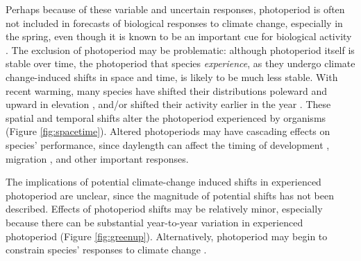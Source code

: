 \documentclass{article}
\begin{document}
\par Perhaps because of these variable and uncertain responses, photoperiod is often not included in forecasts of biological responses to climate change, especially in the spring, even though it is known to be an important cue for biological activity \citep[but see ][]{duputie2015,Caffarra:2011qf,grevstad2015}. The exclusion of photoperiod may be problematic: although photoperiod itself is stable over time, the photoperiod that species \emph{experience}, as they undergo climate change-induced shifts in space and time, is likely to be much less stable. With recent warming, many species have shifted their distributions poleward and upward in elevation \citep[i.e., range shifts,][]{parmesan2006,chen2011,harsch2009,penuelas2003}, and/or shifted their activity earlier in the year \citep[i.e., phenological shifts][]{parmesan2006, Wolkovich:2012n}. These spatial and temporal shifts alter the photoperiod experienced by organisms (Figure \ref{fig:spacetime}).  Altered photoperiods may have cascading effects on species' performance, since daylength can affect the timing of development \citep{muir1994,grevstad2015}, migration \citep{dawbin1966}, and other important responses. 

\par The implications of potential climate-change induced shifts in experienced photoperiod are unclear, since the magnitude of potential shifts has not been described. Effects of photoperiod shifts may be relatively minor, especially because there can be substantial year-to-year variation in experienced photoperiod (Figure \ref{fig:greenup}). Alternatively, photoperiod may begin to constrain species' responses to climate change \citep{koerner2010b}.
\end{document}
